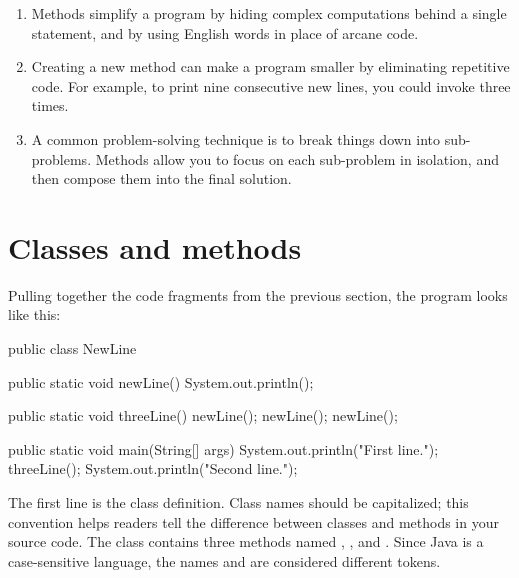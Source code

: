 \begin{enumerate}

\item
Methods simplify a program by hiding complex computations behind a single statement, and by using English words in place of arcane code.

\item Creating a new method can make a program smaller by eliminating repetitive code.
For example, to print nine consecutive new lines, you could invoke  three times.

\item A common problem-solving technique is to break things down into sub-problems.
Methods allow you to focus on each sub-problem in isolation, and then compose them into the final solution.

\end{enumerate}




\section{Classes and methods}


Pulling together the code fragments from the previous section, the program looks like this:

\begin{code}
public class NewLine {

    public static void newLine() {
        System.out.println();
    }

    public static void threeLine() {
        newLine();
        newLine();
        newLine();
    }

    public static void main(String[] args) {
        System.out.println("First line.");
        threeLine();
        System.out.println("Second line.");
    }

}
\end{code}

The first line is the class definition.
Class names should be capitalized; this convention helps readers tell the difference between classes and methods in your source code.
The  class contains three methods named , , and .
Since Java is a case-sensitive language, the names  and  are considered different tokens.


